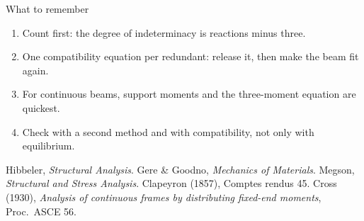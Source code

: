 \documentclass[
  beameroptions={aspectratio=169,ignorenonframetext,11pt},
  articleoptions={11pt,a4paper},
]{beamerswitch}
\begin{document}
\begin{frame}{What to remember}
  \begin{enumerate}
    \item Count first: the degree of indeterminacy is reactions minus three.
    \item<2-> One compatibility equation per redundant: release it, then make the beam fit again.
    \item<3-> For continuous beams, support moments and the three-moment equation are quickest.
    \item<4-> Check with a second method and with compatibility, not only with equilibrium.
  \end{enumerate}
  \vfill
  {\scriptsize\color{yjSecondary}
    Hibbeler, \emph{Structural Analysis}.\quad
    Gere \& Goodno, \emph{Mechanics of Materials}.\quad
    Megson, \emph{Structural and Stress Analysis}.\quad
    Clapeyron (1857), Comptes rendus 45.\quad
    Cross (1930), \emph{Analysis of continuous frames by distributing fixed-end moments}, Proc.\ ASCE 56.\par}
\end{frame}
\end{document}
